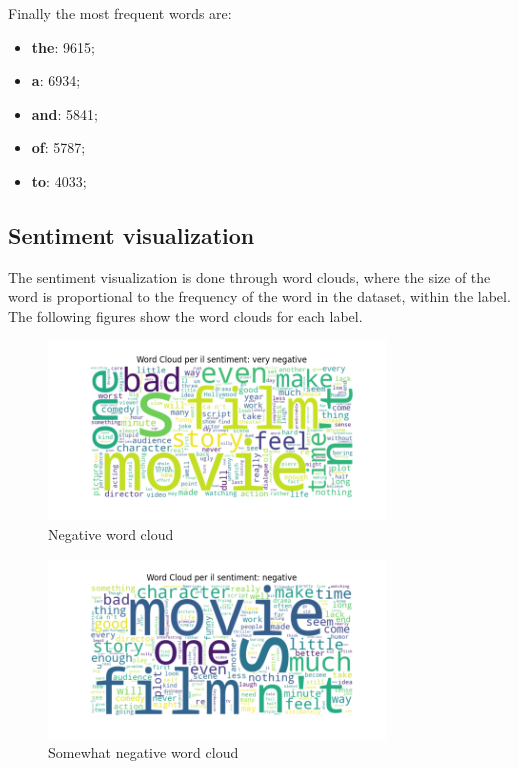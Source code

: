 Finally the most frequent words are:
\begin{itemize}
	\item \textbf{the}: 9615;
	\item \textbf{a}: 6934;
	\item \textbf{and}: 5841;
	\item \textbf{of}: 5787;
	\item \textbf{to}: 4033;
\end{itemize}

\subsection{Sentiment visualization}

The sentiment visualization is done through word clouds, where the size of the
word is proportional to the frequency of the word in the dataset, within the
label. The following figures show the word clouds for each label.

\begin{figure}[H]
	\centering
	\includegraphics[width=0.8\textwidth]{figures/wordcloud_negative.png}
	\caption{Negative word cloud}
	\label{fig:negative_word_cloud}
\end{figure}

\begin{figure}[H]
	\centering
	\includegraphics[width=0.8\textwidth]{figures/wordcloud_snegative.png}
	\caption{Somewhat negative word cloud}
	\label{fig:somewhat_negative_word_cloud}
\end{figure}

